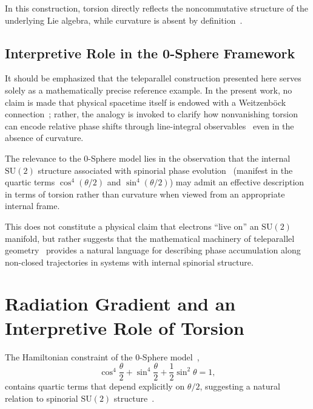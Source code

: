 \documentclass[12pt,letterpaper]{article}
\begin{document}
In this construction, torsion directly reflects the noncommutative structure of the underlying Lie algebra, while curvature is absent by definition~\cite{Weitzenbock1923,Aldrovandi2013}.

\subsection{Interpretive Role in the 0-Sphere Framework}

It should be emphasized that the teleparallel construction presented here serves solely as a mathematically precise reference example. In the present work, no claim is made that physical spacetime itself is endowed with a Weitzenb\"{o}ck connection~\cite{Weitzenbock1923}; rather, the analogy is invoked to clarify how nonvanishing torsion can encode relative phase shifts through line-integral observables~\cite{hanamura18203433} even in the absence of curvature.

The relevance to the 0-Sphere model lies in the observation that the internal $\mathrm{SU}(2)$ structure associated with spinorial phase evolution~\cite{hanamura18067760} (manifest in the quartic terms $\cos^4(\theta/2)$ and $\sin^4(\theta/2)$) may admit an effective description in terms of torsion rather than curvature when viewed from an appropriate internal frame.

This does not constitute a physical claim that electrons ``live on'' an $\mathrm{SU}(2)$ manifold, but rather suggests that the mathematical machinery of teleparallel geometry~\cite{Aldrovandi2013} provides a natural language for describing phase accumulation along non-closed trajectories in systems with internal spinorial structure.


\section{Radiation Gradient and an Interpretive Role of Torsion}

\justifying
The Hamiltonian constraint of the 0-Sphere model~\cite{hanamura16759284,hanamura17765017},
\begin{equation}
\cos^{4} \frac{\theta}{2} + \sin^{4} \frac{\theta}{2} + \frac{1}{2}\sin^{2} \theta = 1,
\end{equation}
contains quartic terms that depend explicitly on $\theta/2$, suggesting a natural relation to spinorial $\mathrm{SU}(2)$ structure~\cite{hanamura18067760}.
\end{document}
